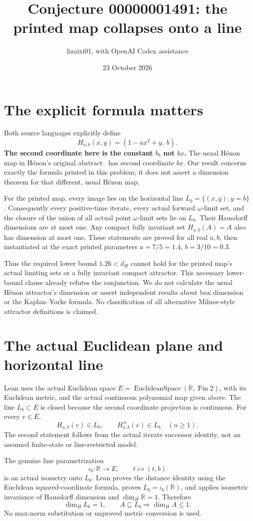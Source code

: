 \documentclass[11pt]{article}
\title{Conjecture 00000001491: the printed map collapses onto a line}
\author{lizaixi01, with OpenAI Codex assistance}
\date{23 October 2026}
\begin{document}
\maketitle
\section{The explicit formula matters}
Both source languages explicitly define
\[
 H_{a,b}(x,y)=(1-ax^2+y,\ b).
\]
\textbf{The second coordinate here is the constant $b$, not $bx$.}
The usual H\'enon map in H\'enon's original abstract~\cite{Henon}
has second coordinate $bx$. Our result concerns exactly the formula
printed in this problem; it does not assert a dimension theorem for
that different, usual H\'enon map.

For the printed map, every image lies on the horizontal line
$L_b=\{(x,y):y=b\}$. Consequently every positive-time iterate,
every actual forward $\omega$-limit set, and the closure of the union
of all actual point $\omega$-limit sets lie on $L_b$. Their Hausdorff
dimensions are at most one. Any compact fully invariant set
$H_{a,b}(A)=A$ also has dimension at most one. These statements are
proved for all real $a,b$, then instantiated at the exact printed
parameters $a=7/5=1.4$, $b=3/10=0.3$.

Thus the required lower bound $1.26<d_H$ cannot hold for the
printed map's actual limiting sets or a fully invariant compact
attractor. This necessary lower-bound clause already refutes the
conjunction. We do not calculate the usual H\'enon attractor's
dimension or assert independent results about box dimension or
the Kaplan--Yorke formula. No classification of all alternative
Milnor-style attractor definitions is claimed.

\section{The actual Euclidean plane and horizontal line}
Lean uses the actual Euclidean space
$E=\operatorname{EuclideanSpace}(\mathbb R,\operatorname{Fin}2)$,
with its Euclidean metric, and the actual continuous polynomial map
given above. The line $L_b\subset E$ is closed because the second
coordinate projection is continuous. For every $v\in E$,
\[
 H_{a,b}(v)\in L_b,\qquad
 H_{a,b}^{\,n}(v)\in L_b\quad(n\ge1).
\]
The second statement follows from the actual iterate successor
identity, not an assumed finite-state or line-restricted model.

The genuine line parametrization
\[
 \iota_b:\mathbb R\longrightarrow E,\qquad t\longmapsto(t,b)
\]
is an actual isometry onto $L_b$. Lean proves the distance identity
using the Euclidean squared-coordinate formula, proves
$L_b=\iota_b(\mathbb R)$, and applies isometric invariance of
Hausdorff dimension and $\dim_H\mathbb R=1$. Therefore
\[
 \dim_H L_b=1,\qquad A\subseteq L_b\Rightarrow\dim_H A\le1.
\]
No max-norm substitution or unproved metric conversion is used.
\end{document}
